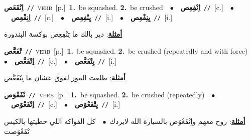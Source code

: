 \documentclass[10pt,a4paper,twoside]{article} %
\begin{document}
\begin{multicols}{2}
{\setlength\topsep{0pt}\textbf{\foreignlanguage{arabic}{اِنْفَعَص}}\ {\color{gray}\texttt{//}\color{black}}\ \textsc{verb}\ [p.]\ \textbf{1.}~be squashed.  \textbf{2.}~be crushed\ \ $\bullet$\ \ \setlength\topsep{0pt}\textbf{\foreignlanguage{arabic}{اِنْفِعِص}}\ {\color{gray}\texttt{//}\color{black}}\ [c.]\ \ $\bullet$\ \ \setlength\topsep{0pt}\textbf{\foreignlanguage{arabic}{اِنِفْعِص}}\ {\color{gray}\texttt{//}\color{black}}\ [c.]\ \ $\bullet$\ \ \setlength\topsep{0pt}\textbf{\foreignlanguage{arabic}{يِنْفِعِص}}\ {\color{gray}\texttt{//}\color{black}}\ [i.]\ \ $\bullet$\ \ \setlength\topsep{0pt}\textbf{\foreignlanguage{arabic}{يِنِفْعِص}}\ {\color{gray}\texttt{//}\color{black}}\ [i.]\  \begin{flushright}\color{gray}\foreignlanguage{arabic}{\textbf{\underline{\foreignlanguage{arabic}{أمثلة}}}: دير بالك ما تِنْفِعِص بوكسة البندورة}\end{flushright}\color{black}} \vspace{2mm}

{\setlength\topsep{0pt}\textbf{\foreignlanguage{arabic}{تْفَعَّص}}\ {\color{gray}\texttt{//}\color{black}}\ \textsc{verb}\ [p.]\ \textbf{1.}~be squashed.  \textbf{2.}~be crushed (repeatedly and with force)\ \ $\bullet$\ \ \setlength\topsep{0pt}\textbf{\foreignlanguage{arabic}{اِتْفَعَّص}}\ {\color{gray}\texttt{//}\color{black}}\ [c.]\ \ $\bullet$\ \ \setlength\topsep{0pt}\textbf{\foreignlanguage{arabic}{يِتْفَعَّص}}\ {\color{gray}\texttt{//}\color{black}}\ [i.]\  \begin{flushright}\color{gray}\foreignlanguage{arabic}{\textbf{\underline{\foreignlanguage{arabic}{أمثلة}}}: طلعت الموز لفوق عشان ما يِتْفَعَّص}\end{flushright}\color{black}} \vspace{2mm}

{\setlength\topsep{0pt}\textbf{\foreignlanguage{arabic}{تْفَعْوَص}}\ {\color{gray}\texttt{//}\color{black}}\ \textsc{verb}\ [p.]\ \textbf{1.}~be squashed.  \textbf{2.}~be crushed (repeatedly)\ \ $\bullet$\ \ \setlength\topsep{0pt}\textbf{\foreignlanguage{arabic}{اِتْفَعْوَص}}\ {\color{gray}\texttt{//}\color{black}}\ [c.]\ \ $\bullet$\ \ \setlength\topsep{0pt}\textbf{\foreignlanguage{arabic}{يِتْفَعْوَص}}\ {\color{gray}\texttt{//}\color{black}}\ [i.]\  \begin{flushright}\color{gray}\foreignlanguage{arabic}{\textbf{\underline{\foreignlanguage{arabic}{أمثلة}}}: روح معهم واِتْفَعْوَص بالسيارة الله لايردك\ $\bullet$\ \  كل الفواكه اللي حطيتها بالكيس تْفَعْوَصت}\end{flushright}\color{black}} \vspace{2mm}


\end{multicols}
\end{document}

